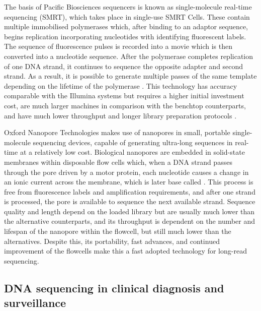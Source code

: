 The basis of Pacific Biosciences sequencers is known as single-molecule real-time sequencing (SMRT), which takes place in single-use SMRT Cells. 
These contain multiple immobilised polymerases which, after binding to an adaptor sequence, begins replication incorporating nucleotides with identifying fluorescent labels. 
The sequence of fluorescence pulses is recorded into a movie which is then converted into a nucleotide sequence. 
After the polymerase completes replication of one DNA strand, it continues to sequence the opposite adapter and second strand. 
As a result, it is possible to generate multiple passes of the same template depending on the lifetime of the polymerase \citep{hoang_long-reads-based_2022, loman_twenty_2015}. 
This technology has accuracy comparable with the Illumina systems but requires a higher initial investment cost, are much larger machines in comparison with the benchtop counterparts, and have much lower throughput and longer library preparation protocols \citep{hoang_long-reads-based_2022, wenger_accurate_2019}. 

Oxford Nanopore Technologies makes use of nanopores in small, portable single-molecule sequencing devices, capable of generating ultra-long sequences in real-time at a relatively low cost. 
Biological nanopores are embedded in solid-state membranes within disposable flow cells which, when a DNA strand passes through the pore driven by a motor protein, each nucleotide causes a change in an ionic current across the membrane, which is later base called \citep{hoang_long-reads-based_2022, loman_twenty_2015}. 
This process is free from fluorescence labels and amplification requirements, and after one strand is processed, the pore is available to sequence the next available strand. 
Sequence quality and length depend on the loaded library but are usually much lower than the alternative counterparts, and its throughput is dependent on the number and lifespan of the nanopore within the flowcell, but still much lower than the alternatives. 
Despite this, its portability, fast advances, and continued improvement of the flowcells make this a fast adopted technology for long-read sequencing.  

\subsection{DNA sequencing in clinical diagnosis and surveillance} \label{ssec:sequencing_diagnosis}

